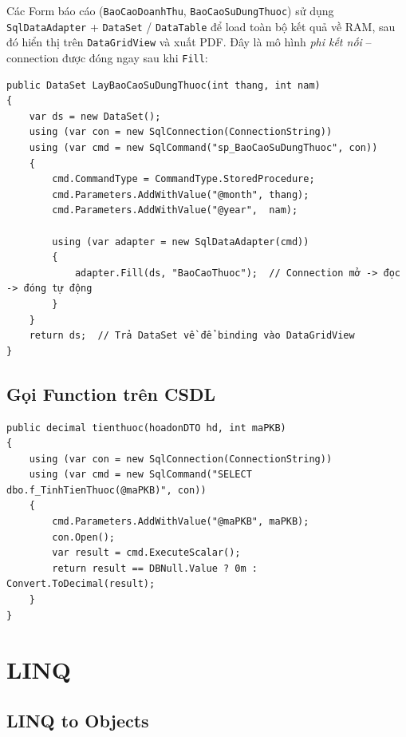 \documentclass[12pt,a4paper]{report}
\begin{document}
Các Form báo cáo (\texttt{BaoCaoDoanhThu}, \texttt{BaoCaoSuDungThuoc}) sử dụng \texttt{SqlDataAdapter} + \texttt{DataSet} / \texttt{DataTable} để load toàn bộ kết quả về RAM, sau đó hiển thị trên \texttt{DataGridView} và xuất PDF. Đây là mô hình \emph{phi kết nối} -- connection được đóng ngay sau khi \texttt{Fill}:

\begin{lstlisting}[style=csharp,caption={Mô hình phi kết nối -- SqlDataAdapter + DataSet}]
public DataSet LayBaoCaoSuDungThuoc(int thang, int nam)
{
    var ds = new DataSet();
    using (var con = new SqlConnection(ConnectionString))
    using (var cmd = new SqlCommand("sp_BaoCaoSuDungThuoc", con))
    {
        cmd.CommandType = CommandType.StoredProcedure;
        cmd.Parameters.AddWithValue("@month", thang);
        cmd.Parameters.AddWithValue("@year",  nam);

        using (var adapter = new SqlDataAdapter(cmd))
        {
            adapter.Fill(ds, "BaoCaoThuoc");  // Connection mở -> đọc -> đóng tự động
        }
    }
    return ds;  // Trả DataSet về để binding vào DataGridView
}
\end{lstlisting}

\subsection{Gọi Function trên CSDL}

\begin{lstlisting}[style=csharp,caption={Gọi Scalar Function f\_TinhTienThuoc qua ADO.NET}]
public decimal tienthuoc(hoadonDTO hd, int maPKB)
{
    using (var con = new SqlConnection(ConnectionString))
    using (var cmd = new SqlCommand("SELECT dbo.f_TinhTienThuoc(@maPKB)", con))
    {
        cmd.Parameters.AddWithValue("@maPKB", maPKB);
        con.Open();
        var result = cmd.ExecuteScalar();
        return result == DBNull.Value ? 0m : Convert.ToDecimal(result);
    }
}
\end{lstlisting}

\section{LINQ}

\subsection{LINQ to Objects}
\end{document}
